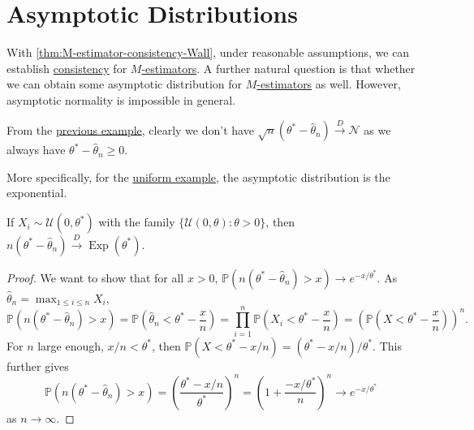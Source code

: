 \section{Asymptotic Distributions}
With \autoref{thm:M-estimator-consistency-Wall}, under reasonable assumptions, we can establish \hyperref[def:consistent]{consistency} for \hyperref[def:M-estimator]{\(M\)-estimators}. A further natural question is that whether we can obtain some asymptotic distribution for \hyperref[def:M-estimator]{\(M\)-estimators} as well. However, asymptotic normality is impossible in general.

\begin{eg}\label{eg:uniform-is-not-asymptotically-normal}
	From the \hyperref[eg:uniform-MLE]{previous example}, clearly we don't have \(\sqrt{n} (\theta^{\ast} - \hat{\theta} _n) \overset{D}{\to} \mathcal{N} \) as we always have \(\theta ^{\ast} - \hat{\theta} _n \geq 0\).
\end{eg}

More specifically, for the \hyperref[eg:uniform-MLE]{uniform example}, the asymptotic distribution is the exponential.

\begin{proposition}\label{prop:uniform-MLE-asymptotic-distribution}
	If \(X_i \sim \mathcal{U} (0, \theta ^{\ast} )\) with the family \(\{\mathcal{U} (0, \theta ) \colon \theta > 0 \} \), then \(n (\theta ^{\ast} - \hat{\theta} _n) \overset{D}{\to} \operatorname{Exp}(\theta ^{\ast} )\).
\end{proposition}
\begin{proof}
	We want to show that for all \(x > 0\), \(\mathbb{P} (n(\theta ^{\ast} - \hat{\theta} _n) > x) \to e^{- x / \theta ^{\ast} }\). As \(\hat{\theta} _n = \max _{1 \leq i \leq n} X_i\),
	\[
		\mathbb{P} (n(\theta ^{\ast} - \hat{\theta} _n) > x)
		= \mathbb{P} \left( \hat{\theta} _n <\theta ^{\ast} - \frac{x}{n} \right)
		= \prod_{i=1}^{n} \mathbb{P} \left( X_i < \theta ^{\ast} - \frac{x}{n} \right)
		= \left( \mathbb{P} \left( X < \theta ^{\ast} - \frac{x}{n} \right) \right) ^n.
	\]
	For \(n\) large enough, \(x / n < \theta ^{\ast} \), then \(\mathbb{P} (X < \theta ^{\ast} - x / n) = (\theta ^{\ast} - x / n) / \theta ^{\ast} \). This further gives
	\[
		\mathbb{P} (n(\theta ^{\ast} - \hat{\theta} _n) > x)
		= \left( \frac{\theta ^{\ast} - x / n}{\theta ^{\ast} } \right) ^n
		= \left( 1 + \frac{- x / \theta ^{\ast} }{n} \right) ^n
		\to e^{- x / \theta ^{\ast} }
	\]
	as \(n \to \infty \).
\end{proof}

